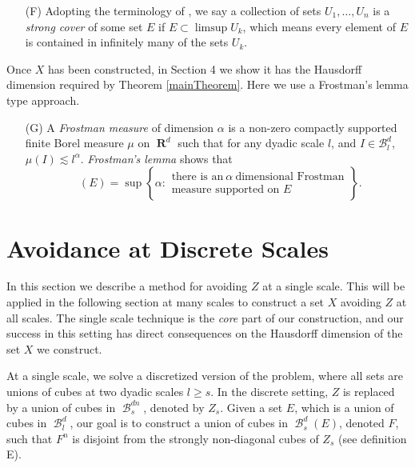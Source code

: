 \documentclass[dvipsnames,letterpaper,12pt]{article}
\theoremstyle{plain}
\DeclareMathOperator{\hausdim}{\dim_{\mathbf{H}}}
\DeclareMathOperator{\RR}{\mathbf{R}}
\DeclareMathOperator{\B}{\mathcal{B}}
\begin{document}
\begin{enumerate}
	\item[(F)] Adopting the terminology of \cite{KatzTao}, we say a collection of sets $U_1, \dots, U_n$ is a {\it strong cover} of some set $E$ if $E \subset \limsup U_k$, which means every element of $E$ is contained in infinitely many of the sets $U_k$.
\end{enumerate}

Once $X$ has been constructed, in Section 4 we show it has the Hausdorff dimension required by Theorem \ref{mainTheorem}. Here we use a Frostman's lemma type approach.

\begin{enumerate}
	\item[(G)] A {\it Frostman measure} of dimension $\alpha$ is a non-zero compactly supported finite Borel measure $\mu$ on $\RR^d$ such that for any dyadic scale $l$, and $I \in \mathcal{B}^d_l$, $\mu(I) \lesssim l^\alpha$. {\it Frostman's lemma} shows that
	\[ \hausdim(E) = \sup \left\{ \alpha: \begin{array}{c} \text{there is an}\ \alpha\ \text{dimensional Frostman}\\
	\text{measure supported on $E$} \end{array} \right\}. \]
\end{enumerate}









\section{Avoidance at Discrete Scales}\label{discretesection}


In this section we describe a method for avoiding $Z$ at a single scale. This will be applied in the following section at many scales to construct a set $X$ avoiding $Z$ at all scales. The single scale technique is the {\it core} part of our construction, and our success in this setting has direct consequences on the Hausdorff dimension of the set $X$ we construct.

At a single scale, we solve a discretized version of the problem, where all sets are unions of cubes at two dyadic scales $l \geq s$. In the discrete setting, $Z$ is replaced by a union of cubes in $\B^{dn}_s$, denoted by $Z_s$. Given a set $E$, which is a union of cubes in $\B_l^d$, our goal is to construct a union of cubes in $\B_s^d(E)$, denoted $F$, such that $F^n$ is disjoint from the strongly non-diagonal cubes of $Z_s$ (see definition E).
\end{document}
